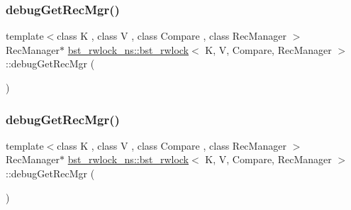 \mbox{\label{classbst__rwlock__ns_1_1bst__rwlock_a824bdfe03d587f211c4454b06b1268ed}} 
\subsubsection{\texorpdfstring{debug\+Get\+Rec\+Mgr()}{debugGetRecMgr()}\hspace{0.1cm}{\footnotesize\ttfamily [1/2]}}
{\footnotesize\ttfamily template$<$class K , class V , class Compare , class Rec\+Manager $>$ \\
Rec\+Manager$\ast$ \hyperlink{classbst__rwlock__ns_1_1bst__rwlock}{bst\+\_\+rwlock\+\_\+ns\+::bst\+\_\+rwlock}$<$ K, V, Compare, Rec\+Manager $>$\+::debug\+Get\+Rec\+Mgr (\begin{DoxyParamCaption}{ }\end{DoxyParamCaption})\hspace{0.3cm}{\ttfamily [inline]}}

\mbox{\label{classbst__rwlock__ns_1_1bst__rwlock_a824bdfe03d587f211c4454b06b1268ed}} 
\subsubsection{\texorpdfstring{debug\+Get\+Rec\+Mgr()}{debugGetRecMgr()}\hspace{0.1cm}{\footnotesize\ttfamily [2/2]}}
{\footnotesize\ttfamily template$<$class K , class V , class Compare , class Rec\+Manager $>$ \\
Rec\+Manager$\ast$ \hyperlink{classbst__rwlock__ns_1_1bst__rwlock}{bst\+\_\+rwlock\+\_\+ns\+::bst\+\_\+rwlock}$<$ K, V, Compare, Rec\+Manager $>$\+::debug\+Get\+Rec\+Mgr (\begin{DoxyParamCaption}{ }\end{DoxyParamCaption})\hspace{0.3cm}{\ttfamily [inline]}}

